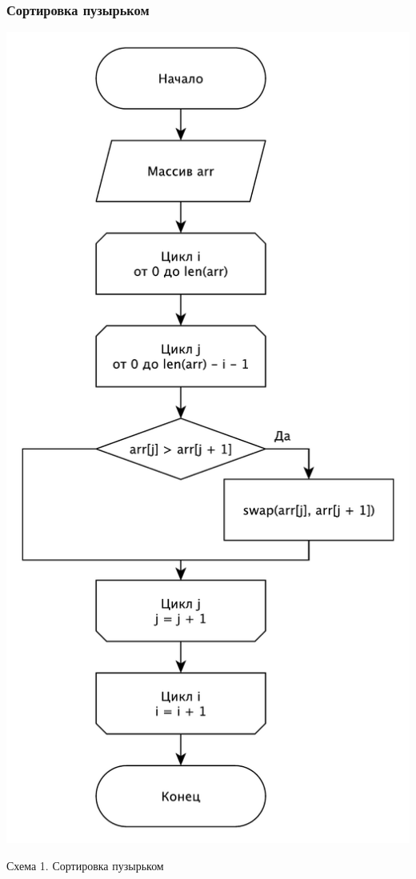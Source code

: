 \documentclass[a4paper,12pt]{article}
\begin{document}
\subsubsection{Сортировка пузырьком}

\begin{center}
    \includegraphics[scale=0.55]{Bubble}

    Схема 1. Сортировка пузырьком
\end{center}
\end{document}

